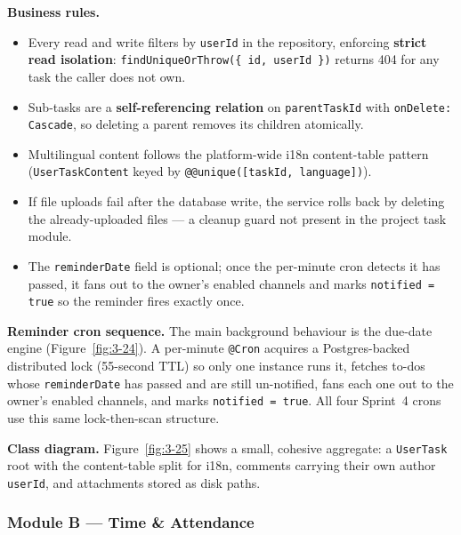 \textbf{Business rules.}
\begin{itemize}
  \item Every read and write filters by \texttt{userId} in the repository, enforcing
    \textbf{strict read isolation}: \texttt{findUniqueOrThrow(\{ id, userId \})} returns 404 for
    any task the caller does not own.
  \item Sub-tasks are a \textbf{self-referencing relation} on \texttt{parentTaskId} with
    \texttt{onDelete: Cascade}, so deleting a parent removes its children atomically.
  \item Multilingual content follows the platform-wide i18n content-table pattern
    (\texttt{UserTaskContent} keyed by \texttt{@@unique([taskId, language])}).
  \item If file uploads fail after the database write, the service rolls back by deleting the
    already-uploaded files --- a cleanup guard not present in the project task module.
  \item The \texttt{reminderDate} field is optional; once the per-minute cron detects it has
    passed, it fans out to the owner's enabled channels and marks \texttt{notified = true} so the
    reminder fires exactly once.
\end{itemize}

\textbf{Reminder cron sequence.} The main background behaviour is the due-date engine
(Figure~\ref{fig:3-24}). A per-minute \texttt{@Cron} acquires a Postgres-backed distributed
lock (55-second TTL) so only one instance runs it, fetches to-dos whose \texttt{reminderDate} has
passed and are still un-notified, fans each one out to the owner's enabled channels, and marks
\texttt{notified = true}. All four Sprint~4 crons use this same lock-then-scan structure.


\textbf{Class diagram.} Figure~\ref{fig:3-25} shows a small, cohesive aggregate: a
\texttt{UserTask} root with the content-table split for i18n, comments carrying their own author
\texttt{userId}, and attachments stored as disk paths.


\subsubsection{Module B --- Time \& Attendance}

